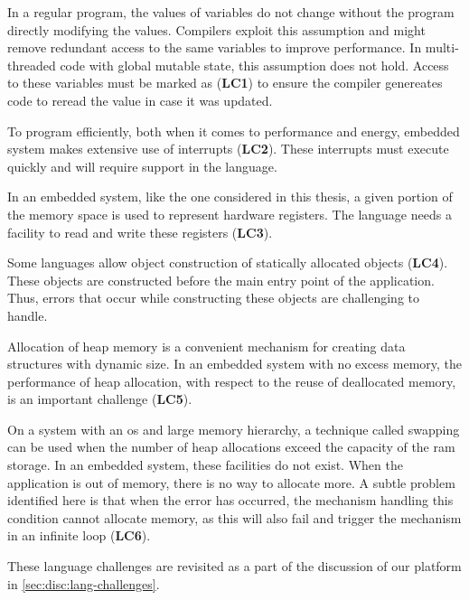 In a regular program, the values of variables do not change without the program directly modifying the values.
Compilers exploit this assumption and might remove redundant access to the same variables to improve performance.
In multi-threaded code with global mutable state, this assumption does not hold.
Access to these variables must be marked as  (\textbf{LC1}) to ensure the compiler genereates code to reread the value in case it was updated.


To program efficiently, both when it comes to performance and energy, embedded system makes extensive use of interrupts (\textbf{LC2}).
These interrupts must execute quickly and will require support in the language.

In an embedded system, like the one considered in this thesis, a given portion of the memory space is used to represent hardware registers.
The language needs a facility to read and write these registers (\textbf{LC3}).

Some languages allow object construction of statically allocated objects (\textbf{LC4}).
These objects are constructed before the main entry point of the application.
Thus, errors that occur while constructing these objects are challenging to handle.

Allocation of heap memory is a convenient mechanism for creating data structures with dynamic size.
In an embedded system with no excess memory, the performance of heap allocation, with respect to the reuse of deallocated memory, is an important challenge (\textbf{LC5}).

On a system with an \gls{os} and large memory hierarchy, a technique called swapping can be used when the number of heap allocations exceed the capacity of the \gls{ram} storage.
In an embedded system, these facilities do not exist.
When the application is out of memory, there is no way to allocate more.
A subtle problem identified here is that when the error has occurred, the mechanism handling this condition cannot allocate memory, as this will also fail and trigger the mechanism in an infinite loop (\textbf{LC6}).

These language challenges are revisited as a part of the discussion of our platform in \autoref{sec:disc:lang-challenges}.
